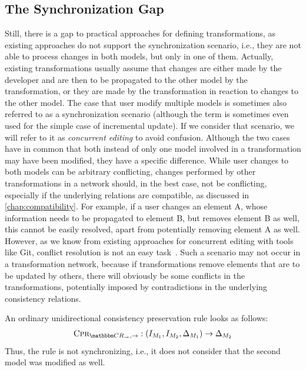 \subsection{The Synchronization Gap}

Still, there is a gap to practical approaches for defining transformations, as existing approaches do not support the synchronization scenario, i.e., they are not able to process changes in both models, but only in one of them.
Actually, existing transformations usually assume that changes are either made by the developer and are then to be propagated to the other model by the transformation, or they are made by the transformation in reaction to changes to the other model.
The case that user modify multiple models is sometimes also referred to as a synchronization scenario (although the term is sometimes even used for the simple case of incremental update).
If we consider that scenario, we will refer to it as \emph{concurrent editing} to avoid confusion.
Although the two cases have in common that both instead of only one model involved in a transformation may have been modified, they have a specific difference.
While user changes to both models can be arbitrary conflicting, changes performed by other transformations in a network should, in the best case, not be conflicting, especially if the underlying relations are compatible, as discussed in \autoref{chap:compatibility}.
For example, if a user changes an element A, whose information needs to be propagated to element B, but removes element B as well, this cannot be easily resolved, apart from potentially removing element A as well.
However, as we know from existing approaches for concurrent editing with tools like Git, conflict resolution is not an easy task~.
Such a scenario may not occur in a transformation network, because if transformations remove elements that are to be updated by others, there will obviously be some conflicts in the transformations, potentially imposed by contradictions in the underlying consistency relations.

An ordinary unidirectional consistency preservation rule looks as follows:
\begin{align*}
    \consistencypreservationrule{\consistencyrelationset{CR}_{\rightarrow},\rightarrow} : (\metamodelinstanceset{M}{1}, \metamodelinstanceset{M}{2}, \changeuniverse{\metamodel{M}{1}}) \rightarrow \changeuniverse{\metamodel{M}{2}}
\end{align*}
Thus, the rule is not synchronizing, i.e., it does not consider that the second model was modified as well.

